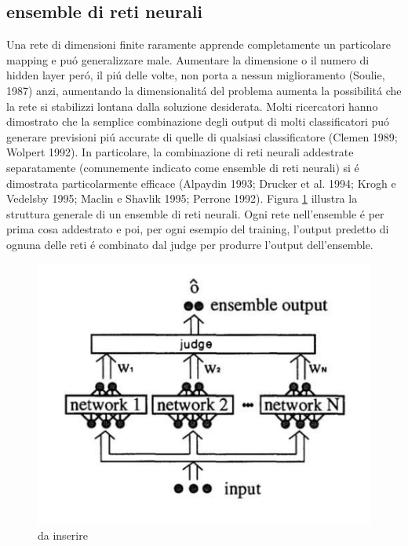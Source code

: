 \documentclass[a4paper,10pt]{article}
\date{12/08/2019}
\begin{document}
 
 \subsection{ensemble di reti neurali}
 Una rete di dimensioni finite raramente apprende completamente un particolare mapping e pu\'o generalizzare male. Aumentare la dimensione o il numero di hidden layer per\'o, il pi\'u delle volte, non porta a nessun miglioramento (Soulie, 1987) anzi, aumentando la dimensionalit\'a del problema aumenta la possibilit\'a che la rete si stabilizzi lontana dalla soluzione desiderata. 
 Molti ricercatori hanno dimostrato che la semplice combinazione degli output di molti classificatori pu\'o generare previsioni pi\'u accurate di quelle di qualsiasi classificatore (Clemen 1989; Wolpert 1992). In particolare, la combinazione di reti neurali addestrate separatamente (comunemente indicato come ensemble di reti neurali) si \'e dimostrata particolarmente efficace (Alpaydin 1993; Drucker et al. 1994; Krogh e Vedelsby 1995; Maclin e Shavlik 1995; Perrone 1992). 
 Figura \ref{EnsembleStructurepng} illustra la struttura generale di un ensemble di reti neurali. Ogni rete nell'ensemble \'e per prima cosa addestrato e poi, per ogni esempio del training, l'output predetto di ognuna delle reti \'e combinato dal judge per produrre l'output dell'ensemble. 
 \begin{figure}[h!]
  \centering
  \includegraphics[scale=0.3]{EnsembleStructure.png}
  \caption{da inserire}
  \label{EnsembleStructurepng}
 \end{figure}
 
\end{document}
